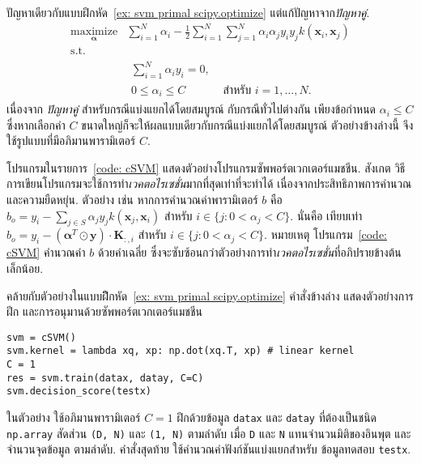 \begin{Exercise}
	\label{ex: svm dual}

ปัญหาเดียวกับแบบฝึกหัด~\ref{ex: svm primal scipy.optimize}
แต่แก้ปัญหาจาก\textit{ปัญหาคู่}.
\begin{eqnarray}
\underset{\bm{\alpha}}{\mathrm{maximize}} &  \sum_{i=1}^N \alpha_i 
- \frac{1}{2}\sum_{i=1}^N \sum_{j=1}^N \alpha_i \alpha_j y_i y_j k(\bm{x}_i, \bm{x}_j) 
\nonumber \\
\mbox{s.t.} & 
\nonumber \\
&
\begin{array}{ll}
\sum_{i=1}^N \alpha_i y_i = 0, &  \\
0 \leq \alpha_i \leq C & \mbox{ สำหรับ } i =1, \ldots, N.
\end{array}
\nonumber 
\end{eqnarray}
เนื่องจาก \textit{ปัญหาคู่} สำหรับกรณีแบ่งแยกได้โดยสมบูรณ์ กับกรณีทั่วไปต่างกัน เพียงข้อกำหนด $\alpha_i \leq C$ ซึ่งหากเลือกค่า $C$ ขนาดใหญ่ก็จะให้ผลแบบเดียวกับกรณีแบ่งแยกได้โดยสมบูรณ์
ตัวอย่างข้างล่างนี้ จึงใช้รูปแบบที่มีอภิมานพารามิเตอร์ $C$.

โปรแกรมในรายการ~\ref{code: cSVM}
แสดงตัวอย่างโปรแกรมซัพพอร์ตเวกเตอร์แมชชีน.
สังเกต วิธีการเขียนโปรแกรมจะใช้การทำ\textit{เวคตอไรเซชั่น}มากที่สุดเท่าที่จะทำได้
เนื่องจากประสิทธิภาพการคำนวณและความยืดหยุ่น.
ตัวอย่าง เช่น 
หากการคำนวณค่าพารามิเตอร์ $b$ คือ
$b_o = y_i  - \sum_{j \in S} \alpha_j y_j k(\bm{x}_j, \bm{x}_i)$ สำหรับ $i \in \{j: 0 < \alpha_j < C \}$.
นั่นคือ เทียบเท่า
$b_o = y_i - (\bm{\alpha}^T \odot \bm{y}) \cdot \bm{K}_{:,i}$ สำหรับ $i \in \{j: 0 < \alpha_j < C \}$.
หมายเหตุ โปรแกรม~\ref{code: cSVM} คำนวณค่า $b$ ด้วยค่าเฉลี่ย ซึ่งจะซับซ้อนกว่าตัวอย่างการทำ\textit{เวคตอไรเซชั่น}ที่อภิปรายข้างต้นเล็กน้อย.


คล้ายกับตัวอย่างในแบบฝึึกหัด~\ref{ex: svm primal scipy.optimize}
คำสั่งข้างล่าง แสดงตัวอย่างการฝีก และการอนุมานด้วยซัพพอร์ตเวกเตอร์แมชชีน
\begin{Verbatim}[fontsize=\small]
svm = cSVM()
svm.kernel = lambda xq, xp: np.dot(xq.T, xp) # linear kernel
C = 1
res = svm.train(datax, datay, C=C)
svm.decision_score(testx)
\end{Verbatim}
ในตัวอย่าง ใช้อภิมานพารามิเตอร์ $C=1$ ฝึกด้วยข้อมูล \verb|datax| และ \verb|datay|
ที่ต้องเป็นชนิด \verb|np.array| สัดส่วน \verb|(D, N)| และ \verb|(1, N)| ตามลำดับ
เมื่อ \verb|D| และ \verb|N| แทนจำนวนมิติของอินพุต และจำนวนจุดข้อมูล ตามลำดับ.
คำสั่งสุดท้าย ใช้คำนวณค่าฟังก์ชันแบ่งแยกสำหรับ ข้อมูลทดสอบ \verb|testx|.


\end{Exercise}
